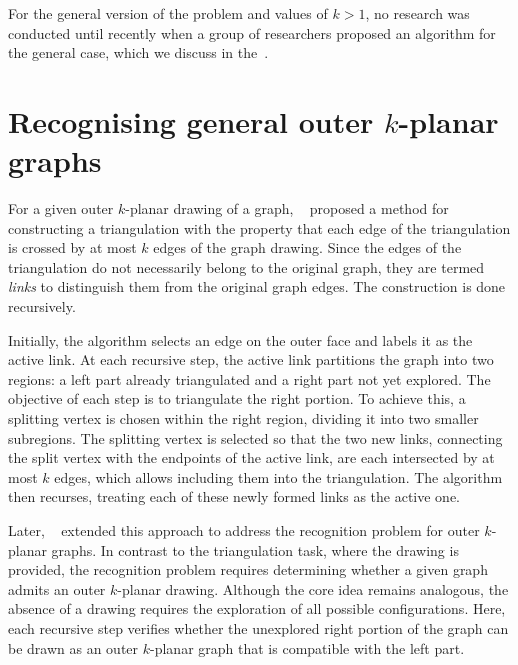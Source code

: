 For the general version of the problem and values of \(k > 1\), no research was conducted until recently when a group of researchers proposed an algorithm for the general case, which we discuss in the~.


\section{Recognising general outer \texorpdfstring{\(k\)}{k}-planar graphs}\label{sec:recognising-general-outer-(k)-planar-graphs}

For a given outer \(k\)-planar drawing of a graph, \citeauthor{triangulations}~\cite{triangulations} proposed a method for constructing a triangulation with the property that each edge of the triangulation is crossed by at most \(k\) edges of the graph drawing. Since the edges of the triangulation do not necessarily belong to the original graph, they are termed \emph{links} to distinguish them from the original graph edges. The construction is done recursively.

Initially, the algorithm selects an edge on the outer face and labels it as the active link. At each recursive step, the active link partitions the graph into two regions: a left part already triangulated and a right part not yet explored. The objective of each step is to triangulate the right portion. To achieve this, a splitting vertex is chosen within the right region, dividing it into two smaller subregions. The splitting vertex is selected so that the two new links, connecting the split vertex with the endpoints of the active link, are each intersected by at most \(k\) edges, which allows including them into the triangulation. The algorithm then recurses, treating each of these newly formed links as the active one.

Later, \citeauthor{okp}~\cite{okp} extended this approach to address the recognition problem for outer \(k\)-planar graphs. In contrast to the triangulation task, where the drawing is provided, the recognition problem requires determining whether a given graph admits an outer \(k\)-planar drawing. Although the core idea remains analogous, the absence of a drawing requires the exploration of all possible configurations. Here, each recursive step verifies whether the unexplored right portion of the graph can be drawn as an outer \(k\)-planar graph that is compatible with the left part.

